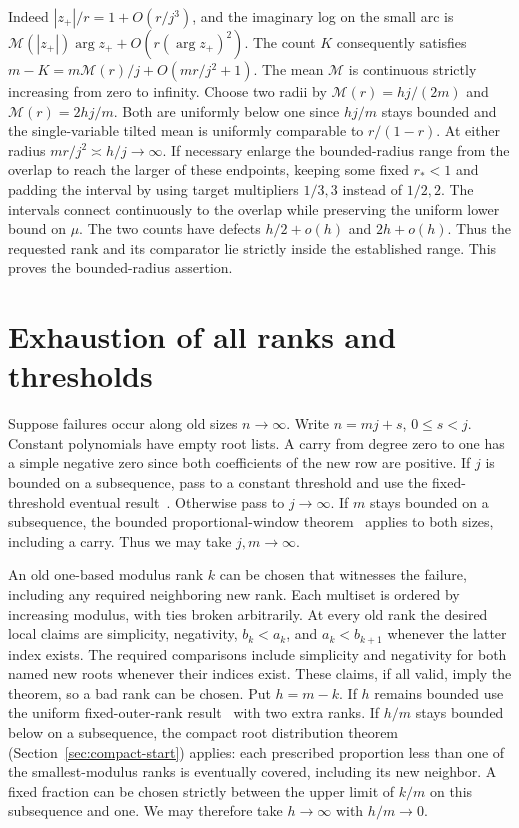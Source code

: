 \documentclass[11pt]{article}
\begin{document}
Indeed \(|z_+|/r=1+O(r/j^3)\), and the imaginary log on the small arc is \(\mathcal M(|z_+|)\arg z_++O(r(\arg z_+)^2)\). The count \(K\) consequently satisfies \(m-K=m\mathcal M(r)/j+O(mr/j^2+1)\). The mean \(\mathcal M\) is continuous strictly increasing from zero to infinity. Choose two radii by \(\mathcal M(r)=hj/(2m)\) and \(\mathcal M(r)=2hj/m\). Both are uniformly below one since \(hj/m\) stays bounded and the single-variable tilted mean is uniformly comparable to \(r/(1-r)\). At either radius \(mr/j^2\asymp h/j\to\infty\). If necessary enlarge the bounded-radius range from the overlap to reach the larger of these endpoints, keeping some fixed \(r_*<1\) and padding the interval by using target multipliers \(1/3,3\) instead of \(1/2,2\). The intervals connect continuously to the overlap while preserving the uniform lower bound on \(\mu\). The two counts have defects \(h/2+o(h)\) and \(2h+o(h)\). Thus the requested rank and its comparator lie strictly inside the established range. This proves the bounded-radius assertion.

\section{Exhaustion of all ranks and thresholds}
\label{sec:assembly}

Suppose failures occur along old sizes \(n\to\infty\). Write \(n=mj+s\), \(0\le s<j\). Constant polynomials have empty root lists. A carry from degree zero to one has a simple negative zero since both coefficients of the new row are positive. If \(j\) is bounded on a subsequence, pass to a constant threshold and use the fixed-threshold eventual result~\cite{fixed}. Otherwise pass to \(j\to\infty\). If \(m\) stays bounded on a subsequence, the bounded proportional-window theorem~\cite{window} applies to both sizes, including a carry. Thus we may take \(j,m\to\infty\).

An old one-based modulus rank \(k\) can be chosen that witnesses the failure, including any required neighboring new rank. Each multiset is ordered by increasing modulus, with ties broken arbitrarily. At every old rank the desired local claims are simplicity, negativity, \(b_k<a_k\), and \(a_k<b_{k+1}\) whenever the latter index exists. The required comparisons include simplicity and negativity for both named new roots whenever their indices exist. These claims, if all valid, imply the theorem, so a bad rank can be chosen. Put \(h=m-k\). If \(h\) remains bounded use the uniform fixed-outer-rank result~\cite{outer} with two extra ranks. If \(h/m\) stays bounded below on a subsequence, the compact root distribution theorem (Section~\ref{sec:compact-start}) applies: each prescribed proportion less than one of the smallest-modulus ranks is eventually covered, including its new neighbor. A fixed fraction can be chosen strictly between the upper limit of \(k/m\) on this subsequence and one. We may therefore take \(h\to\infty\) with \(h/m\to0\).
\end{document}
